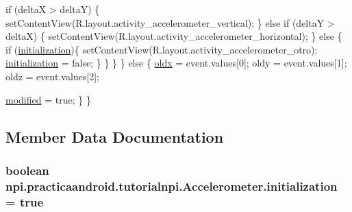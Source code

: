 \begin{DoxyCode}
                \textcolor{keywordflow}{if} (deltaX > deltaY) \{
                    setContentView(R.layout.activity\_accelerometer\_vertical);
                \} \textcolor{keywordflow}{else} \textcolor{keywordflow}{if} (deltaY > deltaX) \{
                    setContentView(R.layout.activity\_accelerometer\_horizontal);
                \}
                \textcolor{keywordflow}{else} \{
                    \textcolor{keywordflow}{if} (\hyperlink{classnpi_1_1practicaandroid_1_1tutorialnpi_1_1_accelerometer_a940cba9dcf2a5bd11cbaad56161d85dc}{initialization})\{
                        setContentView(R.layout.activity\_accelerometer\_otro);
                        \hyperlink{classnpi_1_1practicaandroid_1_1tutorialnpi_1_1_accelerometer_a940cba9dcf2a5bd11cbaad56161d85dc}{initialization} = \textcolor{keyword}{false};
                    \}
                \}
            \}
        \}
        \textcolor{keywordflow}{else} \{
            \hyperlink{classnpi_1_1practicaandroid_1_1tutorialnpi_1_1_accelerometer_adeab08257cb4a687507a01ed9f4a38b6}{oldx} = \textcolor{keyword}{event}.values[0];
            oldy = \textcolor{keyword}{event}.values[1];
            oldz = \textcolor{keyword}{event}.values[2];
            
            \hyperlink{classnpi_1_1practicaandroid_1_1tutorialnpi_1_1_accelerometer_a525132490dab752030175fe7bf6fd4c4}{modified} = \textcolor{keyword}{true};
        \}
    \}
\end{DoxyCode}


\subsection{Member Data Documentation}
\hypertarget{classnpi_1_1practicaandroid_1_1tutorialnpi_1_1_accelerometer_a940cba9dcf2a5bd11cbaad56161d85dc}{
\subsubsection[{initialization}]{\setlength{\rightskip}{0pt plus 5cm}boolean npi.\-practicaandroid.\-tutorialnpi.\-Accelerometer.\-initialization = true\hspace{0.3cm}{\ttfamily [private]}}}\label{classnpi_1_1practicaandroid_1_1tutorialnpi_1_1_accelerometer_a940cba9dcf2a5bd11cbaad56161d85dc}


